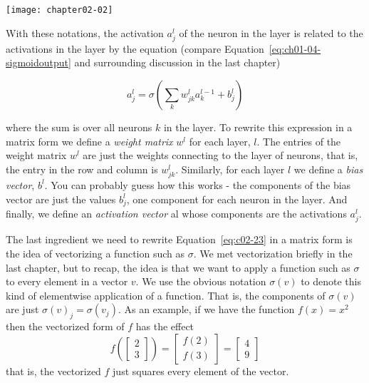 \begin{marginfigure}
\texttt{[image: chapter02-02]}
\end{marginfigure}


With these notations, the activation $a^l_j$ of the  neuron in the  layer is related to the activations in the  layer by the equation (compare Equation~\ref{eq:ch01-04-sigmoidoutput} and surrounding discussion in the last chapter) 

\begin{equation}
a_{j}^{l}=\sigma\left(\sum_{k} w_{j k}^{l} a_{k}^{l-1}+b_{j}^{l}\right)
\label{eq:c02-23}
\end{equation}

where the sum is over all neurons $k$ in the  layer. To rewrite this expression in a matrix form we define a \textit{weight matrix} $w^l$ for each layer, $l$. The entries of the weight matrix $w^l$ are just the weights connecting to the  layer of neurons, that is, the entry in the  row and  column is $w^l_{jk}$. Similarly, for each layer $l$ we define a \textit{bias vector}, $b^l$. You can probably guess how this works - the components of the bias vector are just the values $b^l_j$, one component for each neuron in the  layer. And finally, we define an \textit{activation vector} al whose components are the activations $a^l_j$.

The last ingredient we need to rewrite Equation~\ref{eq:c02-23} in a matrix form is the idea of vectorizing a function such as $\sigma$. We met vectorization briefly in the last chapter, but to recap, the idea is that we want to apply a function such as $\sigma$ to every element in a vector $v$. We use the obvious notation $\sigma(v)$ to denote this kind of elementwise application of a function. That is, the components of $\sigma(v)$ are just $\sigma(v)_j=\sigma(v_j)$. As an example, if we have the function $f(x)=x^2$ then the vectorized form of $f$ has the effect 
\begin{equation}
f\left(\left[ \begin{array}{l}{2} \\ {3}\end{array}\right]\right)
=
\left[ \begin{array}{l}{f(2)} \\ {f(3)}\end{array}\right]
=
\left[ \begin{array}{l}{4} \\ {9}\end{array}\right]
\label{eq:c02-24}
\end{equation}
that is, the vectorized $f$ just squares every element of the vector.

